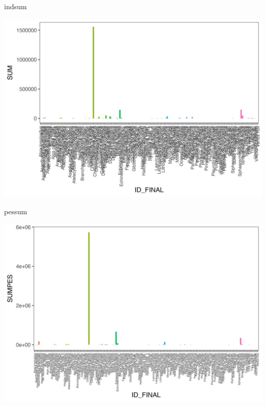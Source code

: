 \documentclass[
]{article}
\newenvironment{Shaded}{\begin{snugshade}}{\end{snugshade}}
\newcommand{\NormalTok}[1]{#1}
\begin{document}
\begin{Shaded}
\begin{Highlighting}[]
\NormalTok{indsum}
\end{Highlighting}
\end{Shaded}

\begin{center}\includegraphics{SAR_Method_files/figure-latex/unnamed-chunk-4-1} \end{center}

\begin{Shaded}
\begin{Highlighting}[]
\NormalTok{pessum}
\end{Highlighting}
\end{Shaded}

\begin{center}\includegraphics{SAR_Method_files/figure-latex/unnamed-chunk-5-1} \end{center}
\end{document}

